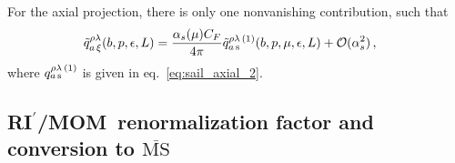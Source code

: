\documentclass[11pt,a4paper]{article}
\DeclareRobustCommand{\eq}[1]{eq.~\eqref{eq:#1}}
\newcommand{\MS}{{\overline{\mathrm{MS}}}}
\newcommand{\eps}{\epsilon}
\newcommand{\cO}{\mathcal{O}}
\newcommand{\as}{\alpha_s}
\newcommand{\RIpMOM}{RI$^\prime$/MOM}
\begin{document}
For the axial projection, there is only one nonvanishing contribution, such that
\begin{align}
 \tilde q^{\rho\lambda}_{a\,\xi}(b,p,\eps,L) &= \frac{\as(\mu) C_F}{4\pi} \tilde q^{\rho\lambda\,(1)}_{a\,\rm s}(b,p,\mu,\eps,L)+\cO(\as^2)
\,,\end{align}
where $q^{\rho\lambda\,(1)}_{a\,\rm s}$ is given in \eq{sail_axial_2}.


\subsection[RI'/MOM renormalization factor and conversion to \texorpdfstring{$\MS$}{MSbar}]
           {\boldmath \RIpMOM~renormalization factor and conversion to $\MS$}
\label{sec:RIMOM_nlo}
\end{document}
